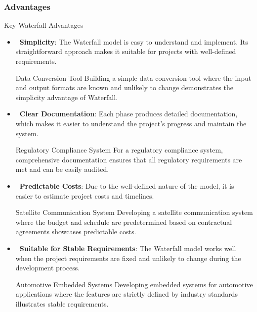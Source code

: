 \subsubsection{Advantages}

\begin{highlightbox}{Key Waterfall Advantages}
  \begin{itemize}
    \item \textbf{\faGraduationCap\ Simplicity}: The Waterfall model is easy to understand and implement. Its straightforward approach makes it suitable for projects with well-defined requirements.
          \begin{examplecard}{Data Conversion Tool}
            Building a simple data conversion tool where the input and output formats are known and unlikely to change demonstrates the simplicity advantage of Waterfall.
          \end{examplecard}
    \item \textbf{\faFile[regular]\ Clear Documentation}: Each phase produces detailed documentation, which makes it easier to understand the project's progress and maintain the system.
          \begin{examplecard}{Regulatory Compliance System}
            For a regulatory compliance system, comprehensive documentation ensures that all regulatory requirements are met and can be easily audited.
          \end{examplecard}
    \item \textbf{\faCalculator\ Predictable Costs}: Due to the well-defined nature of the model, it is easier to estimate project costs and timelines.
          \begin{examplecard}{Satellite Communication System}
            Developing a satellite communication system where the budget and schedule are predetermined based on contractual agreements showcases predictable costs.
          \end{examplecard}
    \item \textbf{\faLock\ Suitable for Stable Requirements}: The Waterfall model works well when the project requirements are fixed and unlikely to change during the development process.
          \begin{examplecard}{Automotive Embedded Systems}
            Developing embedded systems for automotive applications where the features are strictly defined by industry standards illustrates stable requirements.
          \end{examplecard}
  \end{itemize}
\end{highlightbox}

